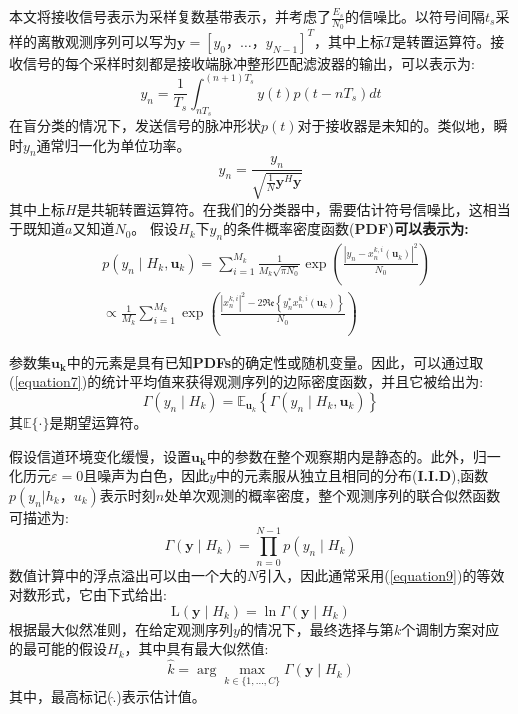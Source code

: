 \documentclass[final]{cvpr}
\begin{document}
本文将接收信号表示为采样复数基带表示，并考虑了$\frac{E_s}{N_0}$的信噪比。以符号间隔$t_s$采样的离散观测序列可以写为$\mathbf{y}=[y_0，\dots，y_{N−1}]^T$，其中上标$T$是转置运算符。接收信号的每个采样时刻都是接收端脉冲整形匹配滤波器的输出，可以表示为:
\begin{equation}
y_{n}=\frac{1}{T_{s}} \int_{n T_{s}}^{(n+1) T_{s}} y(t) p\left(t-n T_{s}\right) d t \label{equation5}
\end{equation}
在盲分类的情况下，发送信号的脉冲形状$p(t)$对于接收器是未知的。类似地，瞬时$y_n$通常归一化为单位功率。
\begin{equation}
y_{n}=\frac{y_{n}}{\sqrt{\frac{1}{N} \mathbf{y}^{H} \mathbf{y}}}\label{equation6}
\end{equation}
其中上标$H$是共轭转置运算符。在我们的分类器中，需要估计符号信噪比，这相当于既知道$a$又知道$N_0$。
假设$H_k$下$y_n$的条件概率密度函数(\bf PDF\rm)可以表示为:
\begin{equation}
\begin{aligned}
&p\left(y_{n} \mid H_{k}, \mathbf{u}_{k}\right) =\sum_{i=1}^{M_{k}} \frac{1}{M_{k} \sqrt{\pi N_{0}}} \exp \left(\frac{\left|y_{n}-x_{n}^{k, i}\left(\mathbf{u}_{k}\right)\right|^{2}}{N_{0}}\right) \\
& \propto \frac{1}{M_{k}} \sum_{i=1}^{M_{k}} \exp \left(\frac{\left|x_{n}^{k, i}\right|^{2}-2 \Re \mathfrak{e}\left\{y_{n}^{*} x_{n}^{k, i}\left(\mathbf{u}_{k}\right)\right\}}{N_{0}}\right)
\end{aligned}\label{equation7}
\end{equation}

参数集$\mathbf{u_k}$中的元素是具有已知\textbf{PDFs}的确定性或随机变量。因此，可以通过取(\ref{equation7})的统计平均值来获得观测序列的边际密度函数，并且它被给出为:
\begin{equation}
\Gamma\left(y_{n} \mid H_{k}\right)=\mathbb{E}_{\mathbf{u}_{k}}\left\{\Gamma\left(y_{n} \mid H_{k}, \mathbf{u}_{k}\right)\right\}\label{equation8}
\end{equation}
其$\mathbb{E}\{·\}$是期望运算符。

假设信道环境变化缓慢，设置$\mathbf{u_k}$中的参数在整个观察期内是静态的。此外，归一化历元$\varepsilon=0$且噪声为白色，因此$y$中的元素服从独立且相同的分布(\textbf{I.I.D}),函数$p(y_n|h_k，u_k)$表示时刻$n$处单次观测的概率密度，整个观测序列的联合似然函数可描述为:
\begin{equation}
\Gamma\left(\mathbf{y} \mid H_{k}\right)=\prod_{n=0}^{N-1} p\left(y_{n} \mid H_{k}\right)\label{equation9}
\end{equation}
数值计算中的浮点溢出可以由一个大的$N$引入，因此通常采用(\ref{equation9})的等效对数形式，它由下式给出:
\begin{equation}
\mathrm{L}\left(\mathbf{y} \mid H_{k}\right)=\ln \Gamma\left(\mathbf{y} \mid H_{k}\right)\label{equation10}
\end{equation}
根据最大似然准则，在给定观测序列$y$的情况下，最终选择与第$k$个调制方案对应的最可能的假设$H_k$，其中具有最大似然值:
\begin{equation}
\widehat{k}=\arg \max _{k \in\{1, \ldots, C\}} \Gamma\left(\mathbf{y} \mid H_{k}\right)\label{equation11}
\end{equation}
其中，最高标记($\widehat{.}$)表示估计值。
\end{document}
